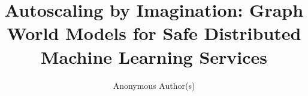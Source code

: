 \documentclass{article}
\title{Autoscaling by Imagination: Graph World Models for Safe Distributed Machine Learning Services}
\author{
  Anonymous Author(s)
}
\begin{document}
\maketitle

\begin{abstract}

\end{abstract}













\newpage
\appendix

\end{document}

